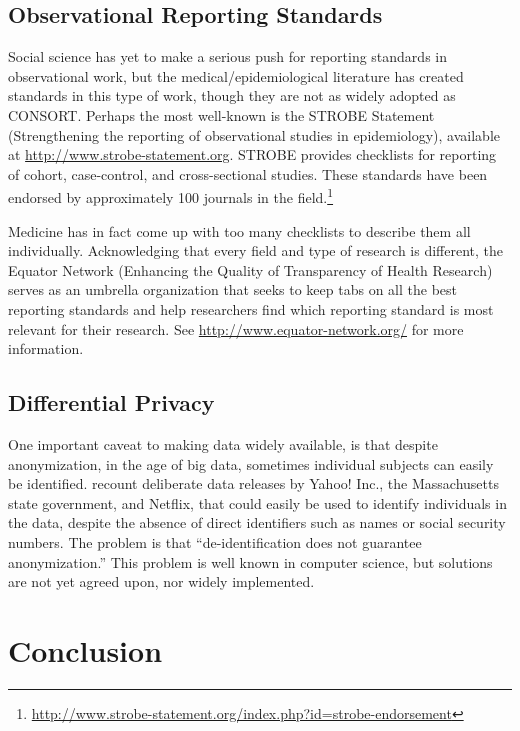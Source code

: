 \documentclass[12pt] {article}
\begin{document}
\subsection{Observational Reporting Standards}\label{observational-standards}
Social science has yet to make a serious push for reporting standards in observational work, but the medical/epidemiological literature has created standards in this type of work, though they are not as widely adopted as CONSORT. Perhaps the most well-known is the STROBE Statement (Strengthening the reporting of observational studies in epidemiology), available at \url{http://www.strobe-statement.org}. STROBE provides checklists for reporting of cohort, case-control, and cross-sectional studies. These standards have been endorsed by approximately 100 journals in the field.\footnote{\url{http://www.strobe-statement.org/index.php?id=strobe-endorsement}}

Medicine has in fact come up with too many checklists to describe them all individually. Acknowledging that every field and type of research is different, the Equator Network (Enhancing the Quality of Transparency of Health Research) serves as an umbrella organization that seeks to keep tabs on all the best reporting standards and help researchers find which reporting standard is most relevant for their research. See \url{http://www.equator-network.org/} for more information.



\subsection{Differential Privacy}\label{differential-privacy}

One important caveat to making data widely available, is that despite
anonymization, in the age of big data, sometimes individual subjects can
easily be identified. \cite{heffetz_privacy_2014} recount deliberate data
releases by Yahoo! Inc., the Massachusetts state government, and
Netflix, that could easily be used to identify individuals in the data,
despite the absence of direct identifiers such as names or social
security numbers. The problem is that ``de-identification does not
guarantee anonymization.'' This problem is well known in computer science, but solutions are not yet agreed upon, nor widely implemented.


\section{Conclusion}\label{conclusion}
\end{document}
